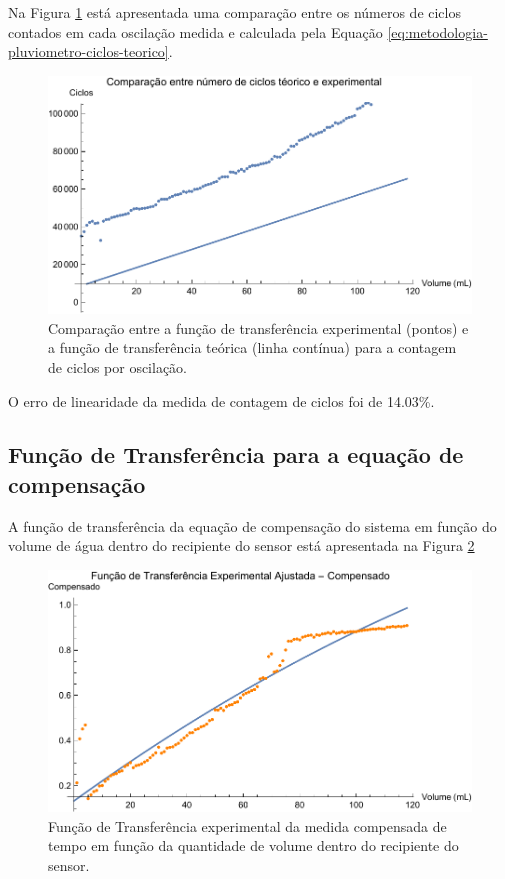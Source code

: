 \documentclass[a4paper]{instrumentacao}
\begin{document}
Na Figura \ref{fig:resultados-pluviometro-ciclos-comparacao} está apresentada uma comparação entre os números de ciclos contados em cada oscilação medida e calculada pela Equação \ref{eq:metodologia-pluviometro-ciclos-teorico}.

\begin{figure}[H]
	\centering \includegraphics[width=\textwidth]{Nivel/Experimental/Ciclos-Comparacao.pdf}
	\caption{Comparação entre a função de transferência experimental (pontos) e a função de transferência teórica (linha contínua) para a contagem de ciclos por oscilação.}
	\label{fig:resultados-pluviometro-ciclos-comparacao}
\end{figure}

O erro de linearidade da medida de contagem de ciclos foi de 14.03\%.

\subsection{Função de Transferência para a equação de compensação}

A função de transferência da equação de compensação do sistema em função do volume de água dentro do recipiente do sensor está apresentada na Figura \ref{fig:resultados-pluviometro-tf-compensado}

\begin{figure}[H]
	\centering \includegraphics[width=\textwidth]{Nivel/Experimental/Compensado-Ajuste.pdf}
	\caption{Função de Transferência experimental da medida compensada de tempo em função da quantidade de volume dentro do recipiente do sensor.}
	\label{fig:resultados-pluviometro-tf-compensado}
\end{figure}
\end{document}
